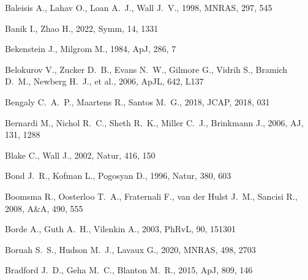 \documentclass[fleqn,12pt]{article}
\begin{document}
\begin{thebibliography}{}
 Baleisis A., Lahav O., Loan A.~J., Wall J.~V., 1998, MNRAS, 297, 545

 Banik I., Zhao H., 2022, Symm, 14, 1331


 Bekenstein J., Milgrom M., 1984, ApJ, 286, 7

 Belokurov V., Zucker D.~B., Evans N.~W., Gilmore G., Vidrih S., Bramich D.~M., Newberg H.~J., et al., 2006, ApJL, 642, L137

 Bengaly C.~A.~P., Maartens R., Santos M.~G., 2018, JCAP, 2018, 031


 Bernardi M., Nichol R.~C., Sheth R.~K., Miller C.~J., Brinkmann J., 2006, AJ, 131, 1288

 Blake C., Wall J., 2002, Natur, 416, 150

 Bond J.~R., Kofman L., Pogosyan D., 1996, Natur, 380, 603

 Boomsma R., Oosterloo T.~A., Fraternali F., van der Hulst J.~M., Sancisi R., 2008, A\&A, 490, 555

 Borde A., Guth A.~H., Vilenkin A., 2003, PhRvL, 90, 151301

 Boruah S.~S., Hudson M.~J., Lavaux G., 2020, MNRAS, 498, 2703

 Bradford J.~D., Geha M.~C., Blanton M.~R., 2015, ApJ, 809, 146


\end{thebibliography}
\end{document}
